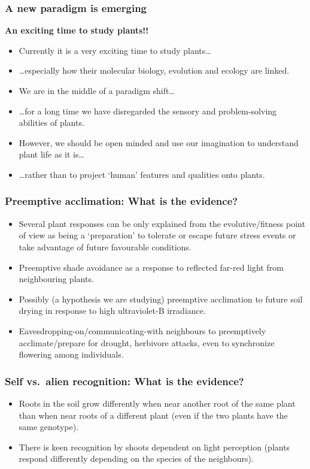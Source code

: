 \documentclass[10pt]{beamer}
\begin{document}
\begin{frame}
\frametitle{A new paradigm is emerging}
\textbf{An exciting time to study plants!!}
    \begin{itemize}
      \item Currently it is a very exciting time to study plants\ldots
      \item \ldots especially how their molecular biology, evolution and ecology are linked.
      \item We are in the middle of a paradigm shift\ldots
      \item \ldots for a long time we have disregarded the sensory and problem-solving abilities of plants.
      \item However, we should be open minded and use our imagination to understand plant life as it is\ldots
      \item \ldots rather than to project `human' features and qualities onto plants.
    \end{itemize}
\end{frame}

\begin{frame}
  \frametitle{Preemptive acclimation: What is the evidence?}
  \begin{itemize}
    \item Several plant responses can be only explained from the evolutive/fitness
    point of view as being a `preparation' to tolerate or escape future stress events or
    take advantage of future favourable conditions.
    \item Preemptive shade avoidance as a response to reflected far-red light from neighbouring
    plants.
    \item Possibly (a hypothesis we are studying) preemptive acclimation to future soil
    drying in response to high ultraviolet-B irradiance.
    \item Eavesdropping-on/communicating-with neighbours to preemptively acclimate/prepare
    for drought, herbivore attacks, even to synchronize flowering among individuals.
  \end{itemize}
\end{frame}

\begin{frame}
  \frametitle{Self vs.\ alien recognition: What is the evidence?}
  \begin{itemize}
    \item Roots in the soil grow differently when near another root of the same plant than
    when near roots of a different plant (even if the two plants have the same genotype).
    \item There is keen recognition by shoots dependent on light perception (plants respond
    differently depending on the species of the neighbours).
  \end{itemize}
\end{frame}
\end{document}
